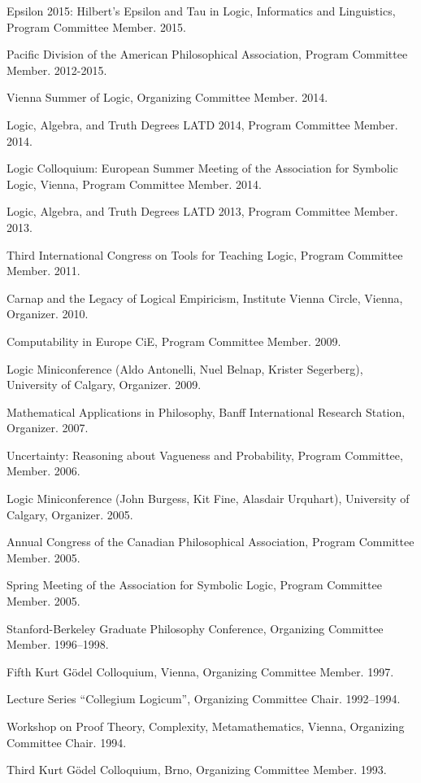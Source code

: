 \documentclass[11pt]{article}
\begin{document}
\ind Epsilon 2015: Hilbert's Epsilon and Tau in Logic, Informatics and
Linguistics, Program Committee Member. 2015.

\ind Pacific Division of the American Philosophical Association, Program
Committee Member. 2012-2015.

\ind Vienna Summer of Logic, Organizing Committee Member. 2014.

\ind Logic, Algebra, and Truth Degrees LATD 2014, Program Committee Member. 2014.

\ind Logic Colloquium: European Summer Meeting of the Association for
Symbolic Logic, Vienna, Program Committee Member. 2014.

\ind Logic, Algebra, and Truth Degrees LATD 2013, Program Committee Member. 2013.

\ind Third International Congress on Tools for Teaching Logic, Program
Committee Member. 2011.

\ind Carnap and the Legacy of Logical Empiricism, Institute Vienna Circle,
Vienna, Organizer. 2010.

\ind Computability in Europe CiE, Program Committee Member. 2009.

\ind Logic Miniconference (Aldo Antonelli, Nuel Belnap, Krister Segerberg),
University of Calgary, Organizer. 2009.

\ind Mathematical Applications in Philosophy, Banff International Research
Station, Organizer. 2007.

\ind Uncertainty: Reasoning about Vagueness and Probability, Program
Committee, Member. 2006.

\ind Logic Miniconference (John Burgess, Kit Fine, Alasdair Urquhart),
University of Calgary, Organizer. 2005.

\ind Annual Congress of the Canadian Philosophical Association, Program
Committee Member. 2005.

\ind Spring Meeting of the Association for Symbolic Logic, Program Committee
Member. 2005.

\ind Stanford-Berkeley Graduate Philosophy Conference, Organizing Committee
Member. 1996--1998.

\ind Fifth Kurt Gödel Colloquium, Vienna, Organizing Committee Member. 1997.

\ind Lecture Series ``Collegium Logicum'', Organizing Committee Chair. 1992--1994.

\ind Workshop on Proof Theory, Complexity, Metamathematics, Vienna,
Organizing Committee Chair. 1994.

\ind Third Kurt Gödel Colloquium, Brno, Organizing Committee Member. 1993.
\end{document}

